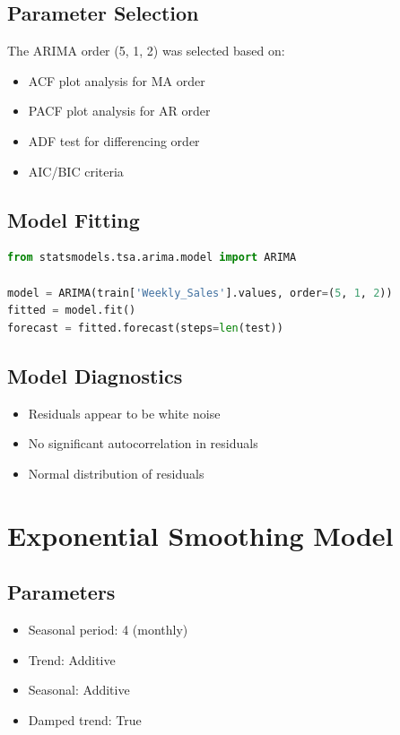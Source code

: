 \documentclass[12pt,a4paper]{report}
\begin{document}
\subsection{Parameter Selection}
The ARIMA order (5, 1, 2) was selected based on:
\begin{itemize}
    \item ACF plot analysis for MA order
    \item PACF plot analysis for AR order
    \item ADF test for differencing order
    \item AIC/BIC criteria
\end{itemize}

\subsection{Model Fitting}
\begin{lstlisting}[language=Python]
from statsmodels.tsa.arima.model import ARIMA

model = ARIMA(train['Weekly_Sales'].values, order=(5, 1, 2))
fitted = model.fit()
forecast = fitted.forecast(steps=len(test))
\end{lstlisting}

\subsection{Model Diagnostics}
\begin{itemize}
    \item Residuals appear to be white noise
    \item No significant autocorrelation in residuals
    \item Normal distribution of residuals
\end{itemize}

\section{Exponential Smoothing Model}
\subsection{Parameters}
\begin{itemize}
    \item Seasonal period: 4 (monthly)
    \item Trend: Additive
    \item Seasonal: Additive
    \item Damped trend: True
\end{itemize}
\end{document}
